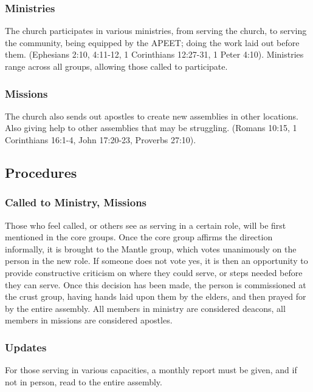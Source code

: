 \documentclass[CSHFoundation.tex]{subfiles}
\begin{document}
\subsubsection{Ministries}

The church participates in various ministries, from serving the church, to serving the community, being equipped by the APEET; doing the work laid out before them. (Ephesians 2:10, 4:11-12, 1 Corinthians 12:27-31, 1 Peter 4:10). Ministries range across all groups, allowing those called to participate.



\subsubsection{Missions}

The church also sends out apostles to create new assemblies in other locations. Also giving help to other assemblies that may be struggling. (Romans 10:15, 1 Corinthians 16:1-4, John 17:20-23, Proverbs 27:10).


\subsection{Procedures}



\subsubsection{Called to Ministry, Missions}

Those who feel called, or others see as serving in a certain role, will be first mentioned in the core groups. Once the core group affirms the direction informally, it is brought to the Mantle group, which votes unanimously on the person in the new role. If someone does not vote yes, it is then an opportunity to provide constructive criticism on where they could serve, or steps needed before they can serve. Once this decision has been made, the person is commissioned at the crust group, having hands laid upon them by the elders, and then prayed for by the entire assembly. All members in ministry are considered deacons, all members in missions are considered apostles.



\subsubsection{Updates}

For those serving in various capacities, a monthly report must be given, and if not in person, read to the entire assembly.
\end{document}
